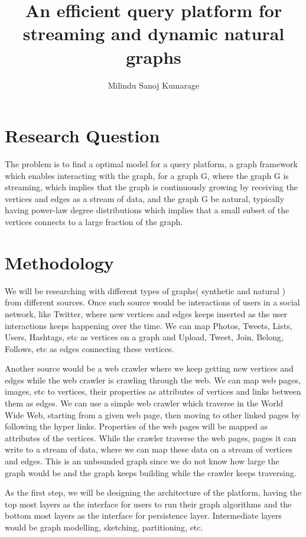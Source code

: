 \documentclass[12pt]{article}
\title{An efficient query platform for streaming and dynamic natural graphs}
\author{Milindu Sanoj Kumarage}
\begin{document}
\tableofcontents

\clearpage 
 
\section{Research Question}
The problem is to find a optimal model for a query platform, a graph framework which enables interacting with the graph, for a graph G, where the graph G is streaming, which implies that the graph is continuously growing by receiving the vertices and edges as a stream of data, and the graph G be natural, typically having power-law degree distributions which implies that a small subset of the vertices connects to a large fraction of the graph.

\section{Methodology}

We will be researching with different types of graphs( synthetic and natural ) from different sources. Once such source would be interactions of users in a social network, like Twitter, where new vertices and edges keeps inserted as the user interactions keeps happening over the time. We can map Photos, Tweets, Lists, Users, Hashtags, etc as vertices on a graph and Upload, Tweet, Join, Belong, Follows, etc as edges connecting these vertices.

Another source would be a web crawler where we keep getting new vertices and edges while the web crawler is crawling through the web. We can map web pages, images, etc to vertices, their properties as attributes of vertices and links between them as edges. We can use a simple web crawler which traverse in the World Wide Web, starting from a given web page, then moving to other linked pages by following the hyper links. Properties of the web pages will be mapped as attributes of the vertices. While the crawler traverse the web pages, pages it can write to a stream of data, where we can map these data on a stream of vertices and edges. This is an unbounded graph since we do not know how large the graph would be and the graph keeps building while the crawler keeps traversing.

As the first step, we will be designing the architecture of the platform, having the top most layers as the interface for users to run their graph algorithms and the bottom most layers as the interface for persistence layer. Intermediate layers would be graph modelling, sketching, partitioning, etc. 
 
\end{document}
